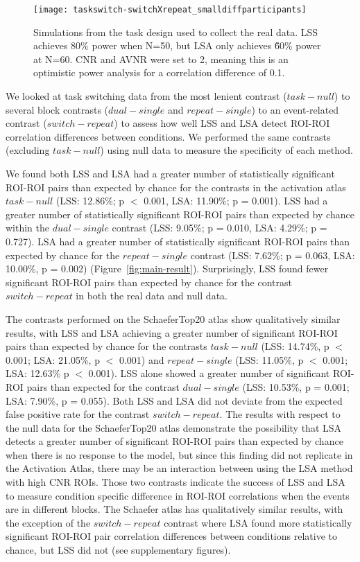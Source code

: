 \documentclass[phd,appendix,figures]{uithesis}
\begin{document}
\begin{figure}[H]
  \texttt{[image: taskswitch-switchXrepeat\_smalldiffparticipants]}
  \caption[Simulation power analysis using real task design]{
    Simulations from the task design used to collect the real data.
    LSS achieves 80\% power when N=50, but LSA only achieves \~60\% power at N=60.
    CNR and AVNR were set to 2, meaning this is an optimistic power analysis
    for a correlation difference of 0.1.
  }
  \label{fig:taskswitch-simulation}
\end{figure}

We looked at task switching data from the most lenient
contrast ($task - null$) to several block contrasts ($dual - single$ and $repeat - single$)
to an event-related contrast ($switch - repeat$)
to assess how well LSS and LSA detect ROI-ROI correlation differences between conditions.
We performed the same contrasts (excluding $task - null$)
using null data to measure the specificity of each method.

We found both LSS and LSA had a greater number of statistically significant ROI-ROI pairs than expected by chance
for the contrasts in the activation atlas $task - null$ (LSS: 12.86\%; p $<$ 0.001, LSA: 11.90\%; p = 0.001).
LSS had a greater number of statistically significant ROI-ROI pairs than expected by chance within the 
$dual - single$ contrast (LSS: 9.05\%; p = 0.010, LSA: 4.29\%; p = 0.727).
LSA had a greater number of statistically significant ROI-ROI pairs than expected by chance for the
$repeat - single$ contrast (LSS: 7.62\%; p = 0.063, LSA: 10.00\%, p = 0.002) (Figure~\ref{fig:main-result}).
Surprisingly, LSS found fewer significant ROI-ROI pairs than expected by chance
for the contrast $switch - repeat$ in both the real data and null data. 

The contrasts performed on the SchaeferTop20 atlas show qualitatively similar results,
with LSS and LSA achieving a greater number of significant ROI-ROI pairs
than expected by chance for the contrasts
$task - null$ (LSS: 14.74\%, p $<$ 0.001; LSA: 21.05\%, p $<$ 0.001) and
$repeat - single$ (LSS: 11.05\%, p $<$ 0.001; LSA: 12.63\% p $<$ 0.001).
LSS alone showed a greater number of significant ROI-ROI pairs than expected
for the contrast
$dual - single$ (LSS: 10.53\%, p = 0.001; LSA: 7.90\%, p = 0.055).
Both LSS and LSA did not deviate from the expected false positive rate for the contrast
$switch - repeat$.
The results with respect to the null data for the SchaeferTop20 atlas demonstrate
the possibility that LSA detects a greater number of significant ROI-ROI
pairs than expected by chance when there is no response to the model, but since this finding did not
replicate in the Activation Atlas, there may be an interaction between using the LSA method with
high CNR ROIs.
Those two contrasts indicate the success of LSS and LSA to measure
condition specific difference in ROI-ROI correlations when the events are in different blocks.
The Schaefer atlas has qualitatively similar results, with the exception of
the $switch - repeat$ contrast where LSA found more statistically significant
ROI-ROI pair correlation differences between conditions relative to chance,
but LSS did not (see supplementary figures).
\end{document}
